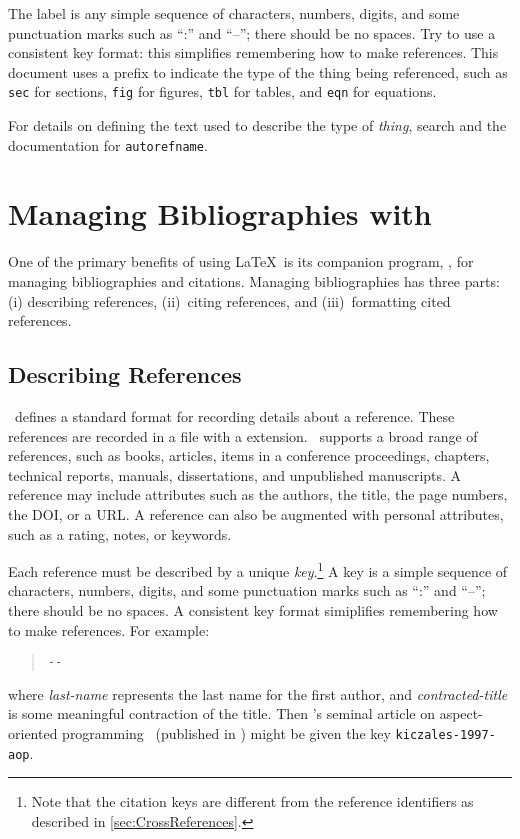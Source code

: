 The label is any simple sequence of characters, numbers, digits,
and some punctuation marks such as ``:'' and ``--''; there should
be no spaces.  Try to use a consistent key format: this simplifies
remembering how to make references.  This document uses a prefix
to indicate the type of the thing being referenced, such as \texttt{sec}
for sections, \texttt{fig} for figures, \texttt{tbl} for tables,
and \texttt{eqn} for equations.

For details on defining the text used to describe the type
of \emph{thing}, search  and the 
documentation for \texttt{autorefname}.


\section{Managing Bibliographies with \BibTeX}
\label{sec:BibTeX}

One of the primary benefits of using \LaTeX\ is its companion program,
\BibTeX, for managing bibliographies and citations.  Managing
bibliographies has three parts: (i) describing references,
(ii)~citing references, and (iii)~formatting cited references.

\subsection{Describing References}

\BibTeX\ defines a standard format for recording details about a
reference.  These references are recorded in a file with a
 extension.  \BibTeX\ supports a broad range of
references, such as books, articles, items in a conference proceedings,
chapters, technical reports, manuals, dissertations, and unpublished
manuscripts. 
A reference may include attributes such as the authors,
the title, the page numbers, the \ac{DOI}, or a \ac{URL}.  A reference
can also be augmented with personal attributes, such as a rating,
notes, or keywords.

Each reference must be described by a unique \emph{key}.\footnote{%
    Note that the citation keys are different from the reference
    identifiers as described in \autoref{sec:CrossReferences}.}
A key is a simple sequence of characters, numbers, digits, and some
punctuation marks such as ``:'' and ``--''; there should be no spaces. 
A consistent key format simiplifies remembering how to make references. 
For example:
\begin{quote}
   \texttt{-}\texttt{-}
\end{quote}
where \emph{last-name} represents the last name for the first author,
and \emph{contracted-title} is some meaningful contraction of the
title.  Then \citeauthor{kiczales-1997-aop}'s seminal article on
aspect-oriented programming~\cite{kiczales-1997-aop} (published in
\citeyear{kiczales-1997-aop}) might be given the key
\texttt{kiczales-1997-aop}.

